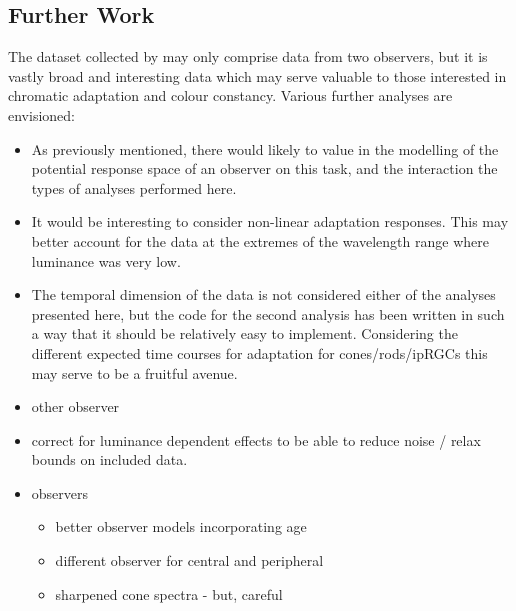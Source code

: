 \subsection{Further Work}

The dataset collected by \citet{macdonald_chromatic_2013} may only comprise data from two observers, but it is vastly broad and interesting data which may serve valuable to those interested in chromatic adaptation and colour constancy. Various further analyses are envisioned:
\begin{itemize}
    \item As previously mentioned, there would likely to value in the modelling of the potential response space of an observer on this task, and the interaction the types of analyses performed here.
    \item It would be interesting to consider non-linear adaptation responses. This may better account for the data at the extremes of the wavelength range where luminance was very low.
    \item The temporal dimension of the data is not considered either of the analyses presented here, but the code for the second analysis has been written in such a way that it should be relatively easy to implement. Considering the different expected time courses for adaptation for cones/rods/\glspl{ipRGC} this may serve to be a fruitful avenue.
    \item other observer %
    \item correct for luminance dependent effects to be able to reduce noise / relax bounds on included data. %
    \item observers %
    \begin{itemize}
    \item better observer models incorporating age %
    \item different observer for central and peripheral %
    \item sharpened cone spectra - but, careful
    \end{itemize}
\end{itemize}










